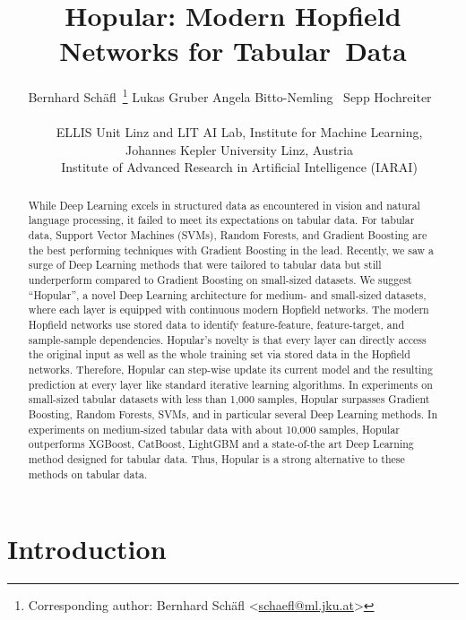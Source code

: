 \documentclass{article}
\title{Hopular: Modern Hopfield Networks for \mbox{Tabular Data}}
\author{
    Bernhard Sch\"{a}fl\footnotemark[2]~\thanks{Corresponding author: Bernhard Sch\"{a}fl <\href{mailto:schaefl@ml.jku.at}{schaefl@ml.jku.at}>} \quad
    Lukas Gruber\footnotemark[2] \quad
    Angela Bitto-Nemling\footnotemark[2]~\footnotemark[3] \quad
    Sepp Hochreiter\footnotemark[2]~\footnotemark[3]\\ \\
  \footnotemark[2]~~ELLIS Unit Linz and LIT AI Lab, Institute for Machine Learning,\\
                  ~~Johannes Kepler University Linz, Austria\\
  \footnotemark[3]~~Institute of Advanced Research in 
  Artificial Intelligence (IARAI)
}
\theoremstyle{plain}
\theoremstyle{definition}
\theoremstyle{remark}
\begin{document}
\maketitle

\begin{abstract}
    While Deep Learning excels in structured data as encountered in vision and
    natural language processing, it failed to meet its expectations on tabular data.
    For tabular data, Support Vector Machines (SVMs), Random Forests,
    and Gradient Boosting are the best performing techniques with Gradient Boosting in the lead.
    Recently, we saw a surge of Deep Learning methods that were tailored to tabular data
    but still underperform compared to Gradient Boosting on small-sized datasets.
    We suggest ``Hopular'', a novel Deep Learning architecture for medium- and
    small-sized datasets,
    where each layer is
    equipped with continuous modern Hopfield networks. The modern Hopfield networks
    use stored data to identify feature-feature, 
    feature-target, and sample-sample dependencies.
    Hopular's novelty is that every layer can directly access 
    the original input as well as the whole training set 
    via stored data in the Hopfield networks.
    Therefore, 
    Hopular can step-wise update its current model and the resulting 
    prediction at every layer 
    like standard iterative learning algorithms.
    In experiments on small-sized tabular datasets with less than 1,000 samples,
    Hopular surpasses Gradient Boosting, Random Forests, SVMs,
    and in particular several Deep Learning methods.
    In experiments on medium-sized tabular data with about 10,000 samples,
    Hopular outperforms XGBoost, CatBoost, LightGBM and 
    a state-of-the art Deep Learning method designed for tabular data.
    Thus, Hopular is a strong alternative to these methods on tabular data.
\end{abstract}


\section{Introduction}
\end{document}
